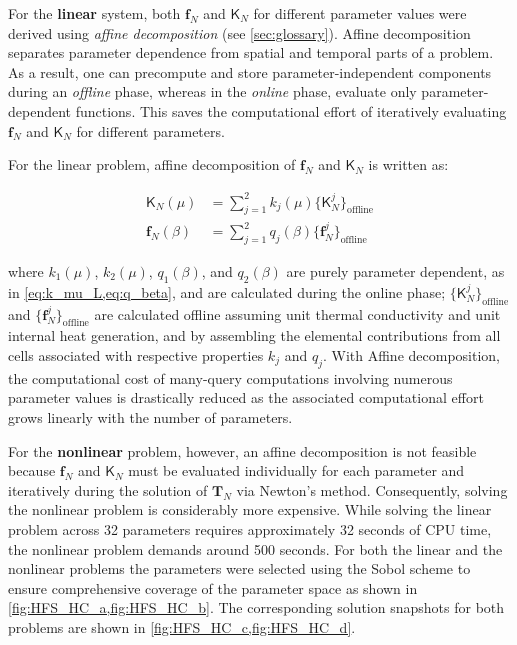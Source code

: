 \documentclass[11pt]{article}
\renewcommand{\vec}[1]{\mathbf{#1}}
\newcommand{\mat}[1]{\mathsf{#1}}
\begin{document}
    For the \textbf{linear} system, both $\vec{f}_N$ and $\mat{K}_N$ for different  parameter values were derived using \textit{affine decomposition} (see \cref{sec:glossary}).
    Affine decomposition separates parameter dependence from spatial and temporal parts of a problem.
    As a result, one can precompute and store parameter-independent components during an \textit{offline} phase, whereas in the \textit{online} phase, evaluate only parameter-dependent functions.
    This saves the computational effort of iteratively evaluating $\vec{f}_N$ and $\mat{K}_N$ for different parameters.

    For the linear problem, affine decomposition of  $\vec{f}_N$ and $\mat{K}_N$ is written as:

    \begin{subequations}
        \begin{align}
        \mat{K}_N(\mu) &= \sum_{j=1}^2 k_j(\mu) \{\mat{K}^j_N\}_{\text{offline}} \\
        \vec{f}_N(\beta) &= \sum_{j=1}^2 q_j(\beta) \{\vec{f}^j_N\}_{\text{offline}}
        \end{align}
        \label{eq:affine_Kb}
    \end{subequations}


    where $k_1(\mu)$, $k_2(\mu)$, $q_1(\beta)$, and $q_2(\beta)$ are purely parameter dependent, as in \cref{eq:k_mu_L,eq:q_beta}, and are calculated during the online phase; $\{\mat{K}^j_N\}_{\text{offline}}$ and $\{\vec{f}^j_N\}_{\text{offline}}$ are calculated offline assuming unit thermal conductivity and unit internal heat generation, and by assembling the elemental contributions from all cells associated with respective properties $k_j$ and $q_j$.
    With Affine decomposition, the computational cost of many-query computations involving numerous parameter values is drastically reduced as the associated  computational effort grows linearly with the number of parameters.


    For the \textbf{nonlinear} problem, however, an affine decomposition is not feasible because \(\vec{f}_N\) and \(\mat{K}_N\) must be evaluated individually for each parameter and iteratively during the solution of \(\vec{T}_N\) via Newton's method.
    Consequently, solving the nonlinear problem is considerably more expensive.
    While solving the linear problem across 32 parameters requires approximately 32 seconds of CPU time, the nonlinear problem demands around 500 seconds.
    For both the linear and the nonlinear problems the parameters were selected using the Sobol scheme \cite{Sobol1967distribution} to ensure comprehensive coverage of the parameter space as shown in \cref{fig:HFS_HC_a,fig:HFS_HC_b}.
    The corresponding solution snapshots for both problems are shown in \cref{fig:HFS_HC_c,fig:HFS_HC_d}.
\end{document}
